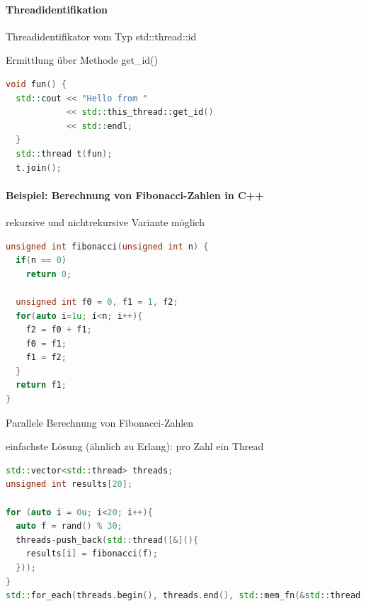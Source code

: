 \documentclass[10pt]{article}
\begin{document}
  \paragraph{Threadidentifikation}
  
  \begin{itemize*}
    \item Threadidentifikator vom Typ std::thread::id
    \item Ermittlung über Methode get\_id()
  \end{itemize*}
  \begin{lstlisting}[language=C++]
  void fun() {
  std::cout << "Hello from "
            << std::this_thread::get_id()
            << std::endl;
  }
  std::thread t(fun);
  t.join();
  \end{lstlisting}
  
  \paragraph{Beispiel: Berechnung von Fibonacci-Zahlen in C++}
  \begin{itemize*}
    \item rekursive und nichtrekursive Variante möglich
  \end{itemize*}
  \begin{lstlisting}[language=C++]
unsigned int fibonacci(unsigned int n) {
  if(n == 0)
    return 0;

  unsigned int f0 = 0, f1 = 1, f2;
  for(auto i=1u; i<n; i++){
    f2 = f0 + f1;
    f0 = f1;
    f1 = f2;
  }
  return f1;
}
\end{lstlisting}
  
  Parallele Berechnung von Fibonacci-Zahlen
  \begin{itemize*}
    \item einfachste Lösung (ähnlich zu Erlang): pro Zahl ein Thread
  \end{itemize*}
  \begin{lstlisting}[language=C++]
std::vector<std::thread> threads;
unsigned int results[20];

for (auto i = 0u; i<20; i++){
  auto f = rand() % 30;
  threads-push_back(std::thread([&](){
    results[i] = fibonacci(f);
  }));
}
std::for_each(threads.begin(), threads.end(), std::mem_fn(&std::thread::join));
\end{lstlisting}
  
\end{document}
